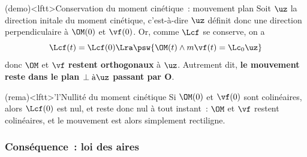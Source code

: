 \documentclass[../../main/main.tex]{subfiles}
\begin{document}
\begin{tcb*}(demo)<lftt>{Conservation du moment cinétique~: mouvement
			plan}
	Soit $\uz$ la direction initale du moment cinétique, c'est-à-dire
	\psw{
		\[\Lcf(0) = \OM(0)\wedge m\vf(0) = \Lc_0 \uz\]
	}
	$\uz$ définit donc une direction perpendiculaire à $\OM(0)$ et $\vf(0)$. Or,
	comme $\Lcf$ se conserve, on a
	\[\Lcf(t) = \Lcf(0) \Lra \psw{\OM(t)\wedge m\vf(t) = \Lc_0\uz}\]
	donc $\OM$ et $\vf$ \textbf{restent orthogonaux} à $\uz$. Autrement dit,
	\textbf{le mouvement reste dans le plan $\perp \text{à} \uz$ passant par O}.
  \hqed
\end{tcb*}

\begin{tcb*}(rema)<lftt>'l'{Nullité du moment cinétique}
	Si $\OM(0)$ et $\vf(0)$ sont colinéaires, alors $\Lcf(0)$ est nul, et reste
	donc nul à tout instant~: $\OM$ et $\vf$ restent colinéaires, et le
	mouvement est alors simplement rectiligne.
\end{tcb*}
\vspace{-15pt}

\subsubsection{Conséquence~: loi des aires}

\end{document}
